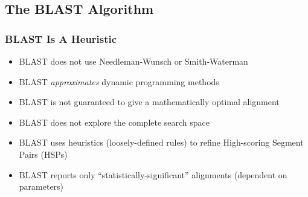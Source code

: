 %

\subsection{The BLAST Algorithm}


\begin{frame}
  \frametitle{BLAST Is A Heuristic}
  \begin{itemize}
    \item BLAST does not use Needleman-Wunsch or Smith-Waterman
    \item BLAST \emph{approximates} dynamic programming methods
    \item BLAST is not guaranteed to give a mathematically optimal alignment
    \item BLAST does not explore the complete search space
    \item BLAST uses heuristics (loosely-defined rules) to refine High-scoring Segment Pairs (HSPs)
    \item BLAST reports only ``statistically-significant'' alignments (dependent on parameters)
  \end{itemize}
\end{frame}

